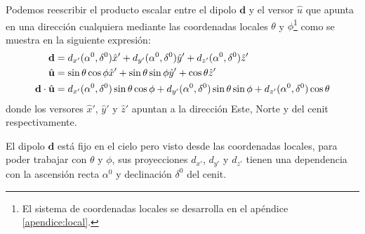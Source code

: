 Podemos reescribir el producto escalar entre el dipolo $\textbf{d}$ y el versor $\hat{u}$ que apunta en una dirección cualquiera mediante las coordenadas locales $\theta$ y $\phi$\footnote{El sistema de coordenadas locales se desarrolla en el apéndice \ref{apendice:local}.} como se muestra en la siguiente expresión: 
\begin{align}
    \textbf{d} &=  d_{x'}(\alpha^0, \delta^0)\hat{x}' +  d_{y'}(\alpha^0, \delta^0)\hat{y}'+ d_{z'}(\alpha^0, \delta^0)\hat{z}' \\
    \hat{\bf{u}} &=\sin\theta \cos\phi \hat{x}' + \sin\theta \sin\phi \hat{y}' + \cos\theta\hat{z}'\\
    \textbf{d}\cdot\hat{\bf{u}} &= d_{x'}(\alpha^0, \delta^0)\sin\theta \cos\phi
    + d_{y'}(\alpha^0, \delta^0) \sin\theta \sin\phi  
     + d_{z'}(\alpha^0, \delta^0)\cos\theta \label{eq:dot-prod-local}
\end{align}
donde los versores $\hat{x}'$, $\hat{y}'$ y $\hat{z}'$ apuntan a la dirección Este, Norte y del cenit respectivamente. 

El dipolo $\textbf{d}$ está fijo en el cielo pero visto desde las coordenadas locales, para poder trabajar con $\theta$ y $\phi$, sus proyecciones  $d_{x'}$, $d_{y'}$ y $d_{z'}$ tienen una dependencia con la ascensión recta  $\alpha^0$ y declinación $\delta^0$ del cenit. 
